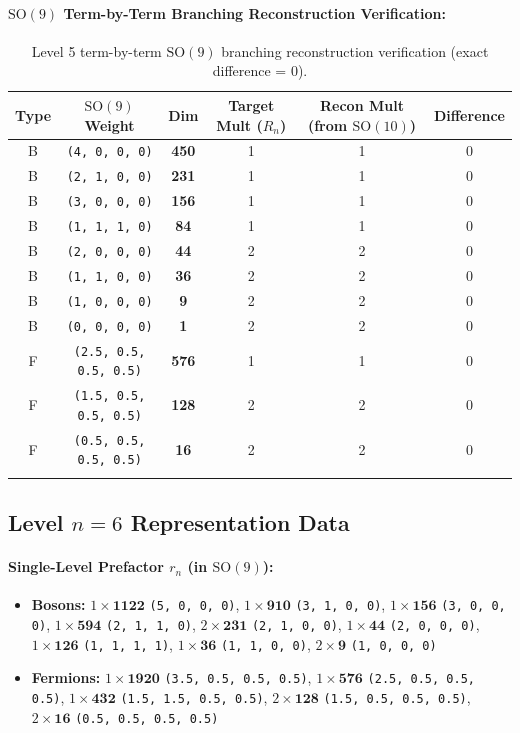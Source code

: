 \documentclass[11pt,a4paper]{article}
\begin{document}
\paragraph{$\mathrm{SO}(9)$ Term-by-Term Branching Reconstruction Verification:}
\begin{longtable}{@{}cccccc@{}}
\toprule
Type & $\mathrm{SO}(9)$ Weight & Dim & Target Mult ($R_n$) & Recon Mult (from $\mathrm{SO}(10)$) & Difference \\
\midrule
\endhead
B & \texttt{(4, 0, 0, 0)} & \textbf{450} & 1 & 1 & 0 \\
B & \texttt{(2, 1, 0, 0)} & \textbf{231} & 1 & 1 & 0 \\
B & \texttt{(3, 0, 0, 0)} & \textbf{156} & 1 & 1 & 0 \\
B & \texttt{(1, 1, 1, 0)} & \textbf{84} & 1 & 1 & 0 \\
B & \texttt{(2, 0, 0, 0)} & \textbf{44} & 2 & 2 & 0 \\
B & \texttt{(1, 1, 0, 0)} & \textbf{36} & 2 & 2 & 0 \\
B & \texttt{(1, 0, 0, 0)} & \textbf{9} & 2 & 2 & 0 \\
B & \texttt{(0, 0, 0, 0)} & \textbf{1} & 2 & 2 & 0 \\
F & \texttt{(2.5, 0.5, 0.5, 0.5)} & \textbf{576} & 1 & 1 & 0 \\
F & \texttt{(1.5, 0.5, 0.5, 0.5)} & \textbf{128} & 2 & 2 & 0 \\
F & \texttt{(0.5, 0.5, 0.5, 0.5)} & \textbf{16} & 2 & 2 & 0 \\
\bottomrule
\caption{Level 5 term-by-term $\mathrm{SO}(9)$ branching reconstruction verification (exact difference = 0).}
\end{longtable}

\subsection{Level $n = 6$ Representation Data}
\paragraph{Single-Level Prefactor $r_n$ (in $\mathrm{SO}(9)$):}
\begin{itemize}
    \item \textbf{Bosons:} $1 \times \mathbf{1122}$ \texttt{(5, 0, 0, 0)}, $1 \times \mathbf{910}$ \texttt{(3, 1, 0, 0)}, $1 \times \mathbf{156}$ \texttt{(3, 0, 0, 0)}, $1 \times \mathbf{594}$ \texttt{(2, 1, 1, 0)}, $2 \times \mathbf{231}$ \texttt{(2, 1, 0, 0)}, $1 \times \mathbf{44}$ \texttt{(2, 0, 0, 0)}, $1 \times \mathbf{126}$ \texttt{(1, 1, 1, 1)}, $1 \times \mathbf{36}$ \texttt{(1, 1, 0, 0)}, $2 \times \mathbf{9}$ \texttt{(1, 0, 0, 0)}
    \item \textbf{Fermions:} $1 \times \mathbf{1920}$ \texttt{(3.5, 0.5, 0.5, 0.5)}, $1 \times \mathbf{576}$ \texttt{(2.5, 0.5, 0.5, 0.5)}, $1 \times \mathbf{432}$ \texttt{(1.5, 1.5, 0.5, 0.5)}, $2 \times \mathbf{128}$ \texttt{(1.5, 0.5, 0.5, 0.5)}, $2 \times \mathbf{16}$ \texttt{(0.5, 0.5, 0.5, 0.5)}
\end{itemize}
\end{document}
